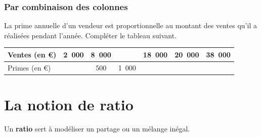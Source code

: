 \documentclass[a4paper]{book}
\begin{document}
\subsubsection{Par combinaison des colonnes}
    \begin{exemple}
        La prime annuelle d'un vendeur est proportionnelle au montant des ventes qu'il a réalisées pendant l'année. Compléter le tableau suivant.

        \vspace{2cm}

        \begin{center}
            \renewcommand{\arraystretch}{1.5}
            \begin{tabular}{|l|c|c|c|c|c|c|}
                \hline
                Ventes (en €) & 2~000 & 8~000 & & 18~000 & 20~000 & 38~000 \\ \hline
                Primes (en €) & & 500 & 1~000 & & & \\ \hline
            \end{tabular}
        \end{center}

        \vspace{2cm}
    \end{exemple}


\newpage


\section{La notion de ratio}
    Un \textbf{ratio} sert à modéliser un partage ou un mélange inégal.
\end{document}
